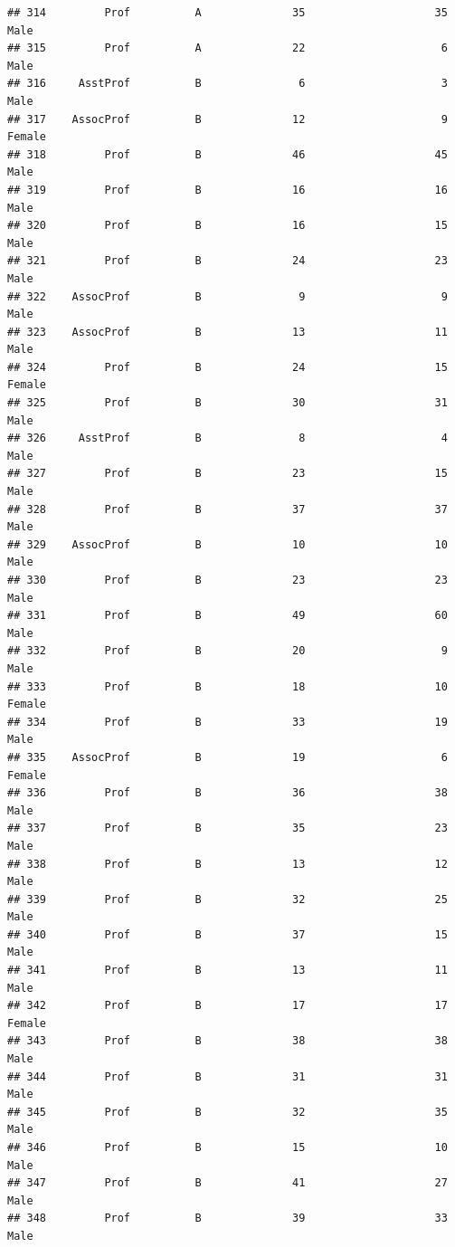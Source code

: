 \documentclass[]{article}
\begin{document}
\begin{verbatim}
## 314         Prof          A              35                    35   Male
## 315         Prof          A              22                     6   Male
## 316     AsstProf          B               6                     3   Male
## 317    AssocProf          B              12                     9 Female
## 318         Prof          B              46                    45   Male
## 319         Prof          B              16                    16   Male
## 320         Prof          B              16                    15   Male
## 321         Prof          B              24                    23   Male
## 322    AssocProf          B               9                     9   Male
## 323    AssocProf          B              13                    11   Male
## 324         Prof          B              24                    15 Female
## 325         Prof          B              30                    31   Male
## 326     AsstProf          B               8                     4   Male
## 327         Prof          B              23                    15   Male
## 328         Prof          B              37                    37   Male
## 329    AssocProf          B              10                    10   Male
## 330         Prof          B              23                    23   Male
## 331         Prof          B              49                    60   Male
## 332         Prof          B              20                     9   Male
## 333         Prof          B              18                    10 Female
## 334         Prof          B              33                    19   Male
## 335    AssocProf          B              19                     6 Female
## 336         Prof          B              36                    38   Male
## 337         Prof          B              35                    23   Male
## 338         Prof          B              13                    12   Male
## 339         Prof          B              32                    25   Male
## 340         Prof          B              37                    15   Male
## 341         Prof          B              13                    11   Male
## 342         Prof          B              17                    17 Female
## 343         Prof          B              38                    38   Male
## 344         Prof          B              31                    31   Male
## 345         Prof          B              32                    35   Male
## 346         Prof          B              15                    10   Male
## 347         Prof          B              41                    27   Male
## 348         Prof          B              39                    33   Male

\end{verbatim}
\end{document}
